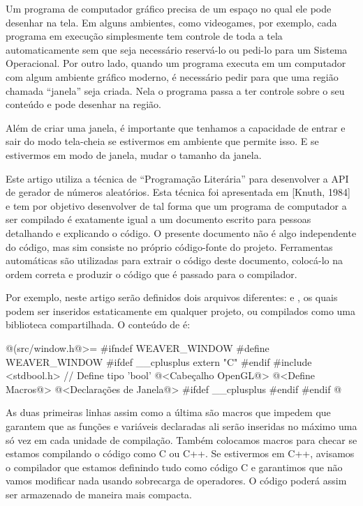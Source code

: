 
Um programa de computador gráfico precisa de um espaço no qual ele
pode desenhar na tela. Em alguns ambientes, como videogames, por
exemplo, cada programa em execução simplesmente tem controle de toda a
tela automaticamente sem que seja necessário reservá-lo ou pedi-lo
para um Sistema Operacional. Por outro lado, quando um programa
executa em um computador com algum ambiente gráfico moderno, é
necessário pedir para que uma região chamada ``janela'' seja
criada. Nela o programa passa a ter controle sobre o seu conteúdo e
pode desenhar na região.

Além de criar uma janela, é importante que tenhamos a capacidade de
entrar e sair do modo tela-cheia se estivermos em ambiente que permite
isso. E se estivermos em modo de janela, mudar o tamanho da
janela.


Este artigo utiliza a técnica de ``Programação Literária'' para
desenvolver a API de gerador de números aleatórios. Esta técnica foi
apresentada em [Knuth, 1984] e tem por objetivo desenvolver
 de tal forma que um programa de computador a ser compilado
é exatamente igual a um documento escrito para pessoas detalhando e
explicando o código. O presente documento não é algo independente do
código, mas sim consiste no próprio código-fonte do projeto.
Ferramentas automáticas são utilizadas para extrair o código deste
documento, colocá-lo na ordem correta e produzir o código que é
passado para o compilador.

Por exemplo, neste artigo serão definidos dois arquivos
diferentes:  e , os quais
podem ser inseridos estaticamente em qualquer projeto, ou compilados
como uma biblioteca compartilhada. O conteúdo de 
é:

\iniciocodigo
@(src/window.h@>=
#ifndef WEAVER_WINDOW
#define WEAVER_WINDOW
#ifdef __cplusplus
extern "C" {
#endif
#include <stdbool.h> // Define tipo 'bool'
@<Cabeçalho OpenGL@>
@<Define Macros@>
@<Declarações de Janela@>
#ifdef __cplusplus
}
#endif
#endif
@
\fimcodigo

As duas primeiras linhas assim como a última são macros que impedem
que garantem que as funções e variáveis declaradas ali serão inseridas
no máximo uma só vez em cada unidade de compilação. Também colocamos
macros para checar se estamos compilando o código como C ou C++. Se
estivermos em C++, avisamos o compilador que estamos definindo tudo
como código C e garantimos que não vamos modificar nada usando
sobrecarga de operadores. O código poderá assim ser armazenado de
maneira mais compacta.

